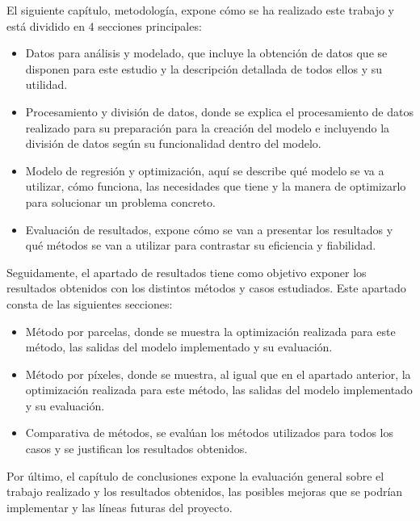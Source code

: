 \par El siguiente capítulo, metodología, expone cómo se ha realizado este trabajo y está dividido en 4 secciones principales:
\begin{itemize}
	\item Datos para análisis y modelado, que incluye la obtención de datos que se disponen para este estudio y la descripción detallada de todos ellos y su utilidad.
	\item Procesamiento y división de datos, donde se explica el procesamiento de datos realizado para su preparación para la creación del modelo e incluyendo la división de datos según su funcionalidad dentro del modelo. 
	\item Modelo de regresión y optimización, aquí se describe qué modelo se va a utilizar, cómo funciona, las necesidades que tiene y la manera de optimizarlo para solucionar un problema concreto. 
	\item Evaluación de resultados, expone cómo se van a presentar los resultados y qué métodos se van a utilizar para contrastar su eficiencia y fiabilidad. 
\end{itemize}

\par Seguidamente, el apartado de resultados tiene como objetivo exponer los resultados obtenidos con los distintos métodos y casos estudiados. Este apartado consta de las siguientes secciones: 
\begin{itemize}
	\item Método por parcelas, donde se muestra la optimización realizada para este método, las salidas del modelo implementado y su evaluación. 
	\item Método por píxeles, donde se muestra, al igual que en el apartado anterior, la optimización realizada para este método, las salidas del modelo implementado y su evaluación. 
	\item Comparativa de métodos, se evalúan los métodos utilizados para todos los casos y se justifican los resultados obtenidos. 
\end{itemize}

\par Por último, el capítulo de conclusiones expone la evaluación general sobre el trabajo realizado y los resultados obtenidos, las posibles mejoras que se podrían implementar y las líneas futuras del proyecto.